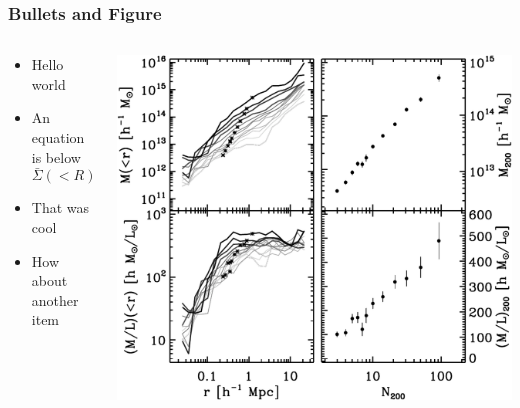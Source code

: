 \documentclass{beamer}
\begin{document}
\frame
{
    \frametitle{Bullets and Figure}

    \begin{columns}

        \begin{column}{0.5\textwidth}

            \begin{itemize}
                \item Hello world
                \item An equation is below
                \begin{equation}
                    \bar{\Sigma}(<R) - \bar{\Sigma}(R) \equiv \Delta \Sigma(R)
                    \nonumber
                \end{equation}
                \item That was cool
                \item How about another item
            \end{itemize}
        \end{column}
        \begin{column}{0.5\textwidth}
            \includegraphics[width=\textwidth]{m2l-ngals200_12-m21-22-l4-application-composite.pdf}
        \end{column}
    \end{columns}
}
\end{document}
